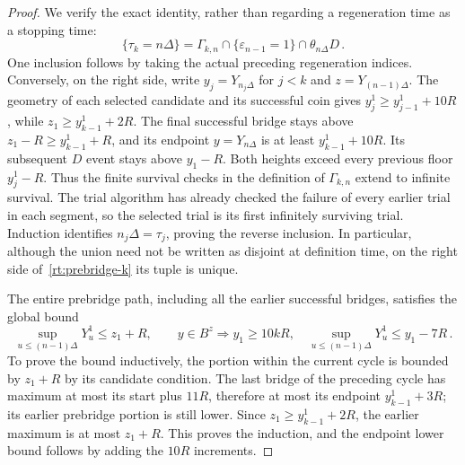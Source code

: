 \documentclass[11pt]{amsart}
\theoremstyle{definition}
\theoremstyle{remark}
\numberwithin{equation}{section}
\begin{document}
\begin{proof}
We verify the exact identity, rather than regarding a regeneration time as a stopping time:
\begin{equation}\label{rt:prebridge-k}
 \{\tau_k=n\Delta\}=\Gamma_{k,n}\cap\{\varepsilon_{n-1}=1\}
                                      \cap\theta_{n\Delta}D\, .
\end{equation}
One inclusion follows by taking the actual preceding regeneration indices. Conversely, on the right side, write $y_j=Y_{n_j\Delta}$ for $j<k$ and $z=Y_{(n-1)\Delta}$. The geometry of each selected candidate and its successful coin gives $y_j^1\geq y_{j-1}^1+10R$, while $z_1\geq y_{k-1}^1+2R$. The final successful bridge stays above $z_1-R\geq y_{k-1}^1+R$, and its endpoint $y=Y_{n\Delta}$ is at least $y_{k-1}^1+10R$. Its subsequent $D$ event stays above $y_1-R$. Both heights exceed every previous floor $y_j^1-R$. Thus the finite survival checks in the definition of $\Gamma_{k,n}$ extend to infinite survival. The trial algorithm has already checked the failure of every earlier trial in each segment, so the selected trial is its first infinitely surviving trial. Induction identifies $n_j\Delta=\tau_j$, proving the reverse inclusion. In particular, although the union need not be written as disjoint at definition time, on the right side of~\eqref{rt:prebridge-k} its tuple is unique.

The entire prebridge path, including all the earlier successful bridges, satisfies the global bound
\begin{equation}\label{rt:global-geometry}
 \sup_{u\leq(n-1)\Delta}Y_u^1\leq z_1+R,
 \qquad y\in B^z\Longrightarrow
 y_1\geq10kR,\quad
 \sup_{u\leq(n-1)\Delta}Y_u^1\leq y_1-7R\, .
\end{equation}
To prove the bound inductively, the portion within the current cycle is bounded by $z_1+R$ by its candidate condition. The last bridge of the preceding cycle has maximum at most its start plus $11R$, therefore at most its endpoint $y_{k-1}^1+3R$; its earlier prebridge portion is still lower. Since $z_1\geq y_{k-1}^1+2R$, the earlier maximum is at most $z_1+R$. This proves the induction, and the endpoint lower bound follows by adding the $10R$ increments.


\end{proof}
\end{document}

